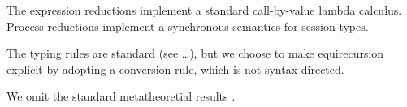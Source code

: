 

The expression reductions implement a standard call-by-value lambda
calculus. Process reductions implement a synchronous semantics for
session types.

The typing rules are standard (see \dots), but we choose to make
equirecursion explicit by adopting a conversion rule, which is not
syntax directed.
\begin{mathpar}
\end{mathpar}

We omit the standard metatheoretial results \cite{metatheory}.

% 

%


